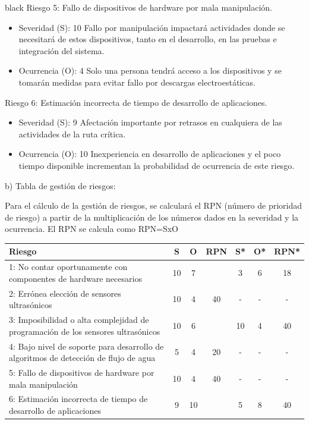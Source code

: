 \documentclass[
11pt, %
codirector, %
]{charter}
\begin{document}
\begin{consigna}{black}
Riesgo 5: Fallo de dispositivos de hardware por mala manipulación.
\begin{itemize}
	\item Severidad (S): 10
	Fallo por manipulación impactará actividades donde se necesitará de estos dispositivos, tanto en el desarrollo, en las pruebas e integración del sistema.
	\item Ocurrencia (O): 4
	Solo una persona tendrá acceso a los dispositivos y se tomarán medidas para evitar fallo por descargas electroestáticas.
\end{itemize}

Riesgo 6: Estimación incorrecta de tiempo de desarrollo de aplicaciones.
\begin{itemize}
	\item Severidad (S): 9
	Afectación importante por retrasos en cualquiera de las actividades de la ruta crítica.
	\item Ocurrencia (O): 10
	Inexperiencia en desarrollo de aplicaciones y el poco tiempo disponible incrementan la probabilidad de ocurrencia de este riesgo.
\end{itemize}



b) Tabla de gestión de riesgos:      

Para el cálculo de la gestión de riesgos, se calculará el RPN (número de prioridad de riesgo) a partir de la multiplicación de los números dados en la severidad y la ocurrencia. El RPN se calcula como RPN=SxO

\begin{table}[htpb]
\centering
\begin{tabularx}{\linewidth}{@{}|X|c|c|c|c|c|c|@{}}
\hline
\rowcolor[HTML]{C0C0C0} 
Riesgo & S & O & RPN &	 S* & O* & RPN* \\ \hline
1: No contar oportunamente con componentes de hardware necesarios   & 10  &  7 & \cellcolor{red}{70}  &  3  & 6   & 18     \\ \hline
2: Errónea elección de sensores ultrasónicos       & 10  &  4 & 40    &  -  &  -  &  -    \\ \hline
3: Imposibilidad o alta complejidad de programación de los sensores ultrasónicos       & 10  &  6 & \cellcolor{red}{60}  & 10   & 4   & 40     \\ \hline
4: Bajo nivel de soporte para desarrollo de algoritmos de detección de flujo de agua       &  5 & 4  & 20  & -   & -   & -     \\ \hline
5: Fallo de dispositivos de hardware por mala manipulación       & 10  & 4  & 40    & -   & -   & -     \\ \hline
6: Estimación incorrecta de tiempo de desarrollo de aplicaciones       &  9   & 10  & \cellcolor{red}{90}    & 5   & 8   & 40     \\ \hline
\end{tabularx}%
\end{table}


\end{consigna}
\end{document}
